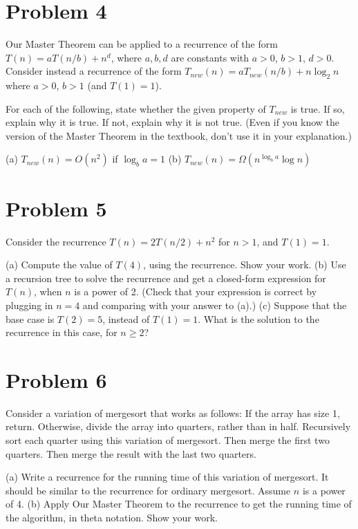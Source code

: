 \documentclass{article}
\begin{document}
\section*{Problem 4}
Our Master Theorem can be applied to a recurrence of the form $T(n) = aT(n/b) + n^d$, where $a, b, d$ are constants with $a > 0$, $b > 1$, $d > 0$. Consider instead a recurrence of the form $T_{new}(n) = aT_{new}(n/b) + n \log_2 n$ where $a > 0$, $b > 1$ (and $T(1) = 1$).

For each of the following, state whether the given property of $T_{new}$ is true. If so, explain why it is true. If not, explain why it is not true. (Even if you know the version of the Master Theorem in the textbook, don’t use it in your explanation.)

(a) $T_{new}(n) = O(n^2)$ if $\log_b a = 1$
(b) $T_{new}(n) = \Omega(n^{\log_b a} \log n)$


\section*{Problem 5}
Consider the recurrence $T(n) = 2T(n/2) + n^2$ for $n > 1$, and $T(1) = 1$.

(a) Compute the value of $T(4)$, using the recurrence. Show your work.
(b) Use a recursion tree to solve the recurrence and get a closed-form expression for $T(n)$, when $n$ is a power of 2. (Check that your expression is correct by plugging in $n = 4$ and comparing with your answer to (a).)
(c) Suppose that the base case is $T(2) = 5$, instead of $T(1) = 1$. What is the solution to the recurrence in this case, for $n \ge 2$?

\section*{Problem 6}
Consider a variation of mergesort that works as follows: If the array has size 1, return. Otherwise, divide the array into quarters, rather than in half. Recursively sort each quarter using this variation of mergesort. Then merge the first two quarters. Then merge the result with the last two quarters.

(a) Write a recurrence for the running time of this variation of mergesort. It should be similar to the recurrence for ordinary mergesort. Assume $n$ is a power of 4.
(b) Apply Our Master Theorem to the recurrence to get the running time of the algorithm, in theta notation. Show your work.
\end{document}
